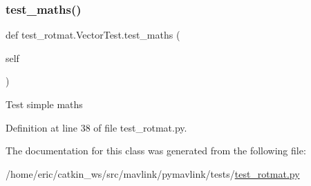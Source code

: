 \subsubsection{\texorpdfstring{test\_maths()}{test\_maths()}}
{\footnotesize\ttfamily def test\+\_\+rotmat.\+Vector\+Test.\+test\+\_\+maths (\begin{DoxyParamCaption}\item[{}]{self }\end{DoxyParamCaption})}

\begin{DoxyVerb}Test simple maths\end{DoxyVerb}
 

Definition at line 38 of file test\+\_\+rotmat.\+py.



The documentation for this class was generated from the following file\+:\begin{DoxyCompactItemize}
\item 
/home/eric/catkin\+\_\+ws/src/mavlink/pymavlink/tests/\mbox{\hyperlink{test__rotmat_8py}{test\+\_\+rotmat.\+py}}\end{DoxyCompactItemize}

